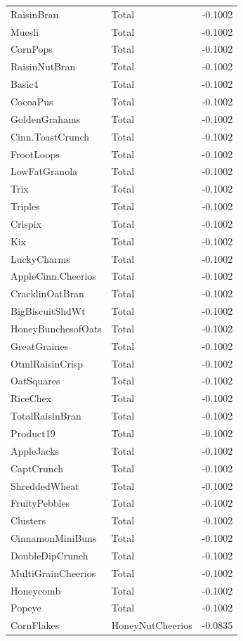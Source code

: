 \begin{table}[!htbp]
\begin{tabular}{lll}
RaisinBran & Total & -0.1002
\\
Muesli & Total & -0.1002
\\
CornPops & Total & -0.1002
\\
RaisinNutBran & Total & -0.1002
\\
Basic4 & Total & -0.1002
\\
CocoaPus & Total & -0.1002
\\
GoldenGrahams & Total & -0.1002
\\
Cinn.ToastCrunch & Total & -0.1002
\\
FrootLoops & Total & -0.1002
\\
LowFatGranola & Total & -0.1002
\\
Trix & Total & -0.1002
\\
Triples & Total & -0.1002
\\
Crispix & Total & -0.1002
\\
Kix & Total & -0.1002
\\
LuckyCharms & Total & -0.1002
\\
AppleCinn.Cheerios & Total & -0.1002
\\
CracklinOatBran & Total & -0.1002
\\
BigBiscuitShdWt & Total & -0.1002
\\
HoneyBunchesofOats & Total & -0.1002
\\
GreatGraines & Total & -0.1002
\\
OtmlRaisinCrisp & Total & -0.1002
\\
OatSquares & Total & -0.1002
\\
RiceChex & Total & -0.1002
\\
TotalRaisinBran & Total & -0.1002
\\
Product19 & Total & -0.1002
\\
AppleJacks & Total & -0.1002
\\
CaptCrunch & Total & -0.1002
\\
ShreddedWheat & Total & -0.1002
\\
FruityPebbles & Total & -0.1002
\\
Clusters & Total & -0.1002
\\
CinnamonMiniBuns & Total & -0.1002
\\
DoubleDipCrunch & Total & -0.1002
\\
MultiGrainCheerios & Total & -0.1002
\\
Honeycomb & Total & -0.1002
\\
Popeye & Total & -0.1002
\\
CornFlakes & HoneyNutCheerios & -0.0835
\\

\end{tabular}
\end{table}
